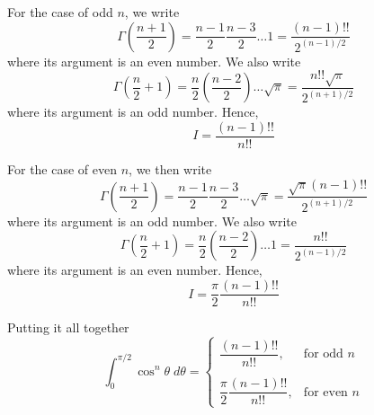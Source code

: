 \documentclass[../../main.tex]{subfiles}
\begin{document}
For the case of odd $n$, we write 
\begin{equation*}
    \Gamma\left(\frac{n+1}{2}\right)=\frac{n-1}{2}\frac{n-3}{2}\dots1=\frac{(n-1)!!}{2^{(n-1)/2}}
\end{equation*}
where its argument is an even number. We also write 
\begin{equation*}
    \Gamma\left(\frac{n}{2}+1\right)= \frac{n}{2}\left(\frac{n-2}{2}\right)\dots\sqrt{\pi}=\frac{n!!\sqrt{\pi}}{2^{(n+1)/2}}
\end{equation*}
where its argument is an odd number. Hence, 
\begin{equation*}
    I=\frac{(n-1)!!}{n!!}
\end{equation*}

For the case of even $n$, we then write 
\begin{equation*}
    \Gamma\left(\frac{n+1}{2}\right)=\frac{n-1}{2}\frac{n-3}{2}\dots\sqrt{\pi}=\frac{\sqrt{\pi}(n-1)!!}{2^{(n+1)/2}}
\end{equation*}
where its argument is an odd number. We also write 
\begin{equation*}
    \Gamma\left(\frac{n}{2}+1\right)= \frac{n}{2}\left(\frac{n-2}{2}\right)\dots1=\frac{n!!}{2^{(n-1)/2}}
\end{equation*}
where its argument is an even number. Hence, 
\begin{equation*}
    I=\frac{\pi}{2}\frac{(n-1)!!}{n!!}
\end{equation*}

Putting it all together
\begin{equation*}
    \int_{0}^{\pi/2}\cos^n\theta\;d\theta=\begin{cases}
        \dfrac{(n-1)!!}{n!!},&\text{for odd $n$}\\\\
        \dfrac{\pi}{2}\dfrac{(n-1)!!}{n!!},&\text{for even $n$}
    \end{cases}
\end{equation*}
\end{document}
